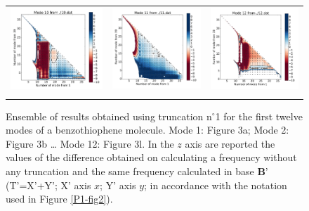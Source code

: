 \begin{figure}[H]
\begin{center}
\begin{tabular}{c c c}
				\includegraphics{image/image/P1-F341} & \includegraphics{image/image/P1-F342} & \includegraphics{image/image/P1-F343}\\   \label{P1-F3}
			\end{tabular}
		\end{center}
		\caption[Ensemble of results obtained using truncation n$^{\circ}$1 for the first twelve modes of a benzothiophene molecule]{Ensemble of results obtained using truncation n$^{\circ}$1 for the first twelve modes of a benzothiophene molecule. Mode 1: Figure 3a; Mode 2: Figure 3b … Mode 12: Figure 3l.
			In the $z$ axis are reported the values of the difference obtained on calculating a frequency without any truncation and the same frequency calculated in base $\textbf{B’}$ (T’=X’+Y’; X’ axis $x$; Y’ axis $y$; in accordance with the notation used in Figure \ref{P1-fig2}).}
	\end{figure}
	

